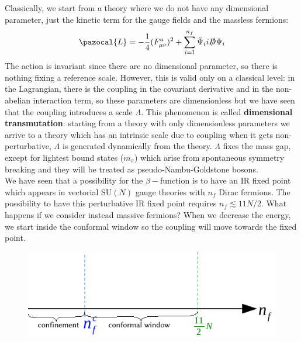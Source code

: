 \documentclass[../main.tex]{subfiles}
\begin{document}
Classically, we start from a theory where we do not have any dimensional parameter, just the kinetic term for the gauge fields and the massless fermions:
\[
\pazocal{L}=-\frac{1}{4}(F_{\mu\nu}^a)^2+\sum_{i=1}^{n_f}\Bar{\Psi}_ii\slashed{D}\Psi_i
\]
The action is invariant since there are no dimensional parameter, so there is nothing fixing a reference scale. However, this is valid only on a classical level: in the Lagrangian, there is the coupling in the covariant derivative and in the non-abelian interaction term, so these parameters are dimensionless but we have seen that the coupling introduces a scale $\Lambda$. This phenomenon is called \textbf{dimensional transmutation}: starting from a theory with only dimensionless parameters we arrive to a theory which has an intrinsic scale due to coupling when it gets non-perturbative, $\Lambda$ is generated dynamically from the theory. $\Lambda$ fixes the mass gap, except for lightest bound states ($m_\pi$) which arise from spontaneous symmetry breaking and they will be treated as pseudo-Nambu-Goldstone bosons.\\
We have seen that a possibility for the $\beta-$function is to have an IR fixed point which appears in vectorial SU$(N)$ gauge theories with $n_f$ Dirac fermions. The possibility to have this perturbative IR fixed point requires $n_f\lesssim11N/2$. What happens if we consider instead massive fermions? When we decrease the energy, we start inside the conformal window so the coupling will move towards the fixed point. 
\begin{figure}[h]
    \centering
    \includegraphics{Images/conf.pdf}
    \caption*{}
    \label{fig:my_label}
\end{figure}
\end{document}
